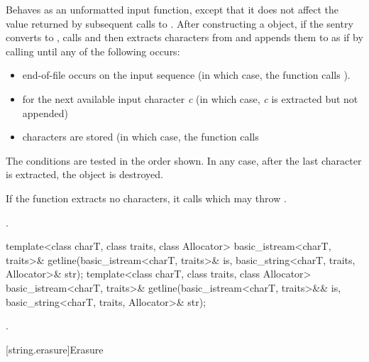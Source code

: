 \begin{itemdescr}
\pnum
\effects
Behaves as an unformatted input function,
except that it does not affect the value returned by subsequent calls to
.
After constructing a
object, if the sentry converts to , calls
and then extracts characters from  and appends them
to  as if by calling
until any of the following occurs:
\begin{itemize}
\item
end-of-file occurs on the input sequence
(in which case, the
function calls
).
\item
{}
for the next available input character
\textit{c}
(in which case,
\textit{c}
is extracted but not appended)
\item
{}
characters are stored
(in which case,
the function calls
\end{itemize}

\pnum
The conditions are tested in the order shown.
In any case,
after the last character is extracted, the
object is destroyed.

\pnum
If the function extracts no characters, it calls
which may throw
.

\pnum
\returns
{}.
\end{itemdescr}

%
\begin{itemdecl}
template<class charT, class traits, class Allocator>
  basic_istream<charT, traits>&
    getline(basic_istream<charT, traits>& is,
            basic_string<charT, traits, Allocator>& str);
template<class charT, class traits, class Allocator>
  basic_istream<charT, traits>&
    getline(basic_istream<charT, traits>&& is,
            basic_string<charT, traits, Allocator>& str);
\end{itemdecl}

\begin{itemdescr}
\pnum
\returns
{}.
\end{itemdescr}

[string.erasure]{Erasure}

